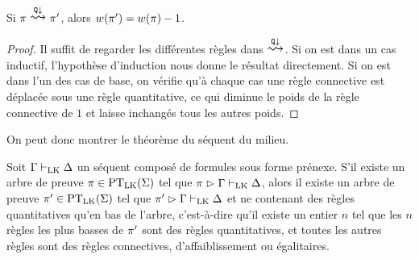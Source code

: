 \begin{proposition}\label{prop.weight.midsequent}
  Si $\varPT\reecr{\quantif\downarrow}\varPT'$, alors
  $w(\pi') = w(\pi) - 1$.
\end{proposition}

\begin{proof}
  Il suffit de regarder les différentes règles dans
  $\reecr{\quantif\downarrow}$. Si on est dans un cas inductif, l'hypothèse
  d'induction nous donne le résultat directement. Si on est dans l'un des
  cas de base, on vérifie qu'à chaque cas une règle connective est déplacée
  sous une règle quantitative, ce qui diminue le poids de la règle connective
  de $1$ et laisse inchangés tous les autres poids.
\end{proof}

\noindent
On peut donc montrer le théorème du séquent du milieu.

\begin{theorem}\label{thm.midsequent}
  Soit $\Gamma\vdash_{\operatorname{LK}}\Delta$ un séquent composé de formules sous forme prénexe.
  S'il existe un arbre de preuve $\pi\in\operatorname{PT}_{\operatorname{LK}}(\Sigma)$ tel que
  $\pi\mathrel{\rhd} \Gamma\vdash_{\operatorname{LK}}\Delta$, alors il existe un arbre de preuve
  $\pi'\in\operatorname{PT}_{\operatorname{LK}}(\Sigma)$ tel que $\pi'\mathrel{\rhd}\Gamma\vdash_{\operatorname{LK}}\Delta$ et ne
  contenant des règles quantitatives qu'en bas de l'arbre, c'est-à-dire qu'il
  existe un entier $n$ tel que les $n$ règles les plus basses de $\pi'$ sont
  des règles quantitatives, et toutes les autres règles sont des règles
  connectives, d'affaiblissement ou égalitaires.
\end{theorem}

